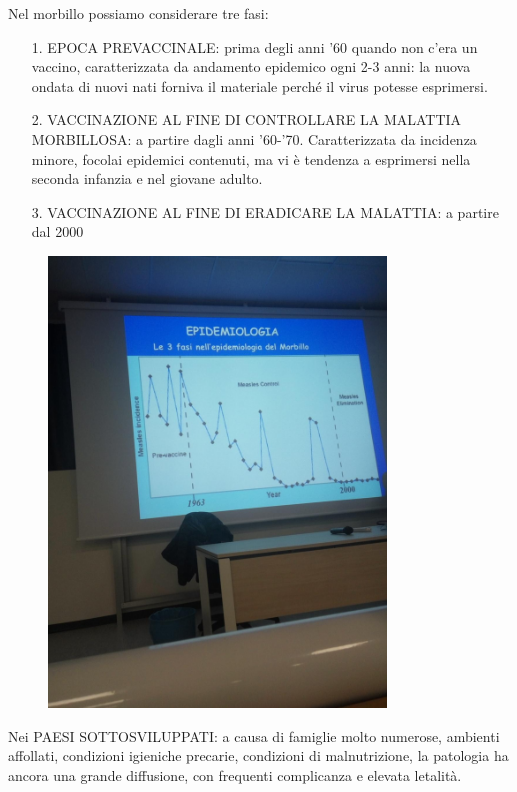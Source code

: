 Nel morbillo possiamo considerare tre fasi:

\begin{itemize}

\item[1.]
 EPOCA
  PREVACCINALE: prima degli anni '60 quando non c'era un vaccino,
  caratterizzata da andamento epidemico ogni 2-3 anni: la nuova ondata
  di nuovi nati forniva il materiale perché il virus potesse esprimersi.
\item [2.]
  VACCINAZIONE AL FINE DI CONTROLLARE LA MALATTIA MORBILLOSA: a partire
  dagli anni '60-'70. Caratterizzata da incidenza minore, focolai
  epidemici contenuti, ma vi è tendenza a esprimersi nella seconda
  infanzia e nel giovane adulto.
\item[3.]
  VACCINAZIONE AL FINE DI ERADICARE LA MALATTIA: a partire dal 2000
\end{itemize}

\begin{figure}[!ht]
\centering
	\includegraphics[width=0.8\textwidth]{07/image1.jpeg}
	\end{figure}

Nei PAESI SOTTOSVILUPPATI: a causa di famiglie molto numerose, ambienti
affollati, condizioni igieniche precarie, condizioni di malnutrizione,
la patologia ha ancora una grande diffusione, con frequenti complicanza
e elevata letalità.

